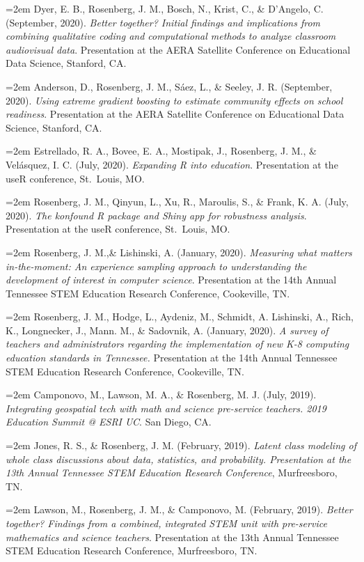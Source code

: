 \documentclass[
  14,
]{article}
\begin{document}
\hangindent=2em Dyer, E. B., Rosenberg, J. M., Bosch, N., Krist, C., \&
D'Angelo, C. (September, 2020). \emph{Better together? Initial findings
and implications from combining qualitative coding and computational
methods to analyze classroom audiovisual data}. Presentation at the AERA
Satellite Conference on Educational Data Science, Stanford, CA.

\hangindent=2em Anderson, D., Rosenberg, J. M., Sáez, L., \& Seeley, J.
R. (September, 2020). \emph{Using extreme gradient boosting to estimate
community effects on school readiness}. Presentation at the AERA
Satellite Conference on Educational Data Science, Stanford, CA.

\hangindent=2em Estrellado, R. A., Bovee, E. A., Mostipak, J.,
Rosenberg, J. M., \& Velásquez, I. C. (July, 2020). \emph{Expanding R
into education}. Presentation at the useR conference, St.~Louis, MO.

\hangindent=2em Rosenberg, J. M., Qinyun, L., Xu, R., Maroulis, S., \&
Frank, K. A. (July, 2020). \emph{The konfound R package and Shiny app
for robustness analysis}. Presentation at the useR conference,
St.~Louis, MO.

\hangindent=2em Rosenberg, J. M.,\& Lishinski, A. (January, 2020).
\emph{Measuring what matters in-the-moment: An experience sampling
approach to understanding the development of interest in computer
science}. Presentation at the 14th Annual Tennessee STEM Education
Research Conference, Cookeville, TN.

\hangindent=2em Rosenberg, J. M., Hodge, L., Aydeniz, M., Schmidt, A.
Lishinski, A., Rich, K., Longnecker, J., Mann. M., \& Sadovnik, A.
(January, 2020). \emph{A survey of teachers and administrators regarding
the implementation of new K-8 computing education standards in
Tennessee.} Presentation at the 14th Annual Tennessee STEM Education
Research Conference, Cookeville, TN.

\hangindent=2em Camponovo, M., Lawson, M. A., \& Rosenberg, M. J. (July,
2019). \emph{Integrating geospatial tech with math and science
pre-service teachers. 2019 Education Summit @ ESRI UC}. San Diego, CA.

\hangindent=2em Jones, R. S., \& Rosenberg, J. M. (February, 2019).
\emph{Latent class modeling of whole class discussions about data,
statistics, and probability. Presentation at the 13th Annual Tennessee
STEM Education Research Conference}, Murfreesboro, TN.

\hangindent=2em Lawson, M., Rosenberg, J. M., \& Camponovo, M.
(February, 2019). \emph{Better together? Findings from a combined,
integrated STEM unit with pre-service mathematics and science teachers}.
Presentation at the 13th Annual Tennessee STEM Education Research
Conference, Murfreesboro, TN.
\end{document}
